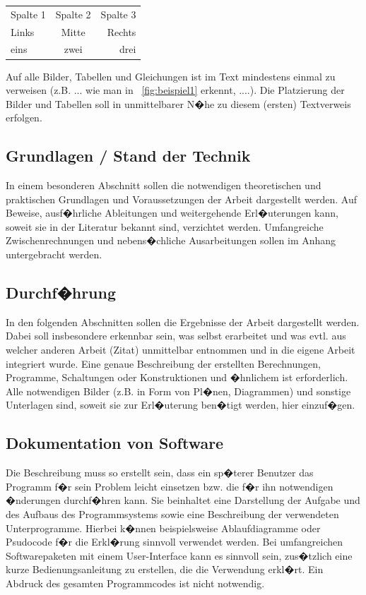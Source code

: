 \begin{table}[!ht]
  \centering
  \begin{tabular}{l|cr}
                                  Spalte 1 & Spalte 2 & Spalte 3\\
                                  \hhline{|=|==|}
                                  Links & Mitte & Rechts\\
                                  \hhline{---}
                                  eins & zwei & drei
  \end{tabular}
  \label{tab:beispiel}
\end{table}

Auf alle Bilder, Tabellen und Gleichungen ist im Text mindestens einmal zu verweisen (z.B. ... wie
man in \figurename~\ref{fig:beispiel1} erkennt, ....). Die Platzierung der Bilder und Tabellen soll in
unmittelbarer N�he zu diesem (ersten) Textverweis erfolgen.


\subsection{Grundlagen / Stand der Technik}
In einem besonderen Abschnitt sollen die notwendigen theoretischen und praktischen Grundlagen
und Voraussetzungen der Arbeit dargestellt werden. Auf Beweise, ausf�hrliche Ableitungen und
weitergehende Erl�uterungen kann, soweit sie in der Literatur bekannt sind, verzichtet werden.
Umfangreiche Zwischenrechnungen und nebens�chliche Ausarbeitungen sollen im Anhang
untergebracht werden.

\subsection{Durchf�hrung}
In den folgenden Abschnitten sollen die Ergebnisse der Arbeit dargestellt werden. Dabei soll insbesondere
erkennbar sein, was selbst erarbeitet und was evtl. aus welcher anderen Arbeit (Zitat) unmittelbar
entnommen und in die eigene Arbeit integriert wurde. Eine genaue Beschreibung der
erstellten Berechnungen, Programme, Schaltungen oder Konstruktionen und �hnlichem ist
erforderlich. Alle notwendigen Bilder (z.B. in Form von Pl�nen, Diagrammen) und sonstige
Unterlagen sind, soweit sie zur Erl�uterung ben�tigt werden, hier einzuf�gen.

\subsection{Dokumentation von Software}
Die Beschreibung muss so erstellt sein, dass ein sp�terer Benutzer das Programm f�r sein Problem
leicht einsetzen bzw. die f�r ihn notwendigen �nderungen durchf�hren kann. Sie beinhaltet eine
Darstellung der Aufgabe und des Aufbaus des Programmsystems sowie eine Beschreibung der verwendeten
Unterprogramme. Hierbei k�nnen beispielsweise Ablaufdiagramme oder Psudocode f�r die Erkl�rung
sinnvoll verwendet werden. Bei umfangreichen Softwarepaketen mit einem User-Interface kann es
sinnvoll sein, zus�tzlich eine kurze Bedienungsanleitung zu erstellen, die die Verwendung erkl�rt.
Ein Abdruck des gesamten Programmcodes ist nicht notwendig.

